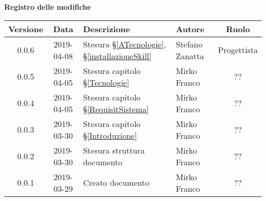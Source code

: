 	\begin{center}
		\textbf{Registro delle modifiche}
	\end{center}
	\begin{center}
		\begin{tabularx}{\textwidth}{|c|c|X|X|c|}
			\hline
			\textbf{Versione} & \textbf{Data} & \textbf{Descrizione} & \textbf{Autore} & \textbf{Ruolo} \\		
			\hline
			0.0.6 & 2019-04-08 & Stesura \S\ref{ATecnologie}, \S\ref{installazioneSkill} & Stefano Zanatta & Progettista \\
			\hline
			0.0.5 & 2019-04-05 & Stesura capitolo \S\ref{Tecnologie} & Mirko Franco & ?? \\
			\hline
			0.0.4 & 2019-04-05 & Stesura capitolo \S\ref{RequisitSistema} & Mirko Franco & ?? \\
			\hline
			0.0.3 & 2019-03-30 & Stesura capitolo \S\ref{Introduzione} & Mirko Franco & ?? \\
			\hline
			0.0.2 & 2019-03-30 & Stesura struttura documento & Mirko Franco & ?? \\
			\hline
			0.0.1 & 2019-03-29 & Creato documento & Mirko Franco & ?? \\
			\hline
		\end{tabularx}
	\end{center}
\newpage